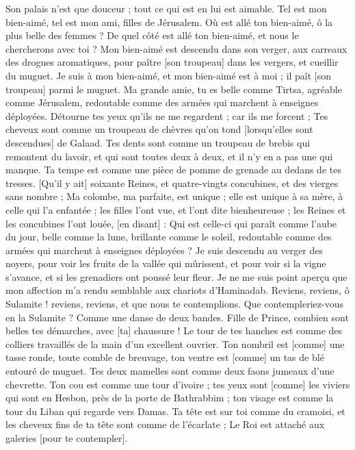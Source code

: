 \begin{multicols}{2}
Son palais n'est que douceur ; tout ce qui est en lui est aimable. Tel est mon bien-aimé, tel est mon ami, filles de Jérusalem.
\VerseOne{}Où est allé ton bien-aimé, ô la plus belle des femmes ? De quel côté est allé ton bien-aimé, et nous le chercherons avec toi ?
Mon bien-aimé est descendu dans son verger, aux carreaux des drogues aromatiques, pour paître [son troupeau] dans les vergers, et cueillir du muguet.
Je suis à mon bien-aimé, et mon bien-aimé est à moi ; il paît [son troupeau] parmi le muguet.
Ma grande amie, tu es belle comme Tirtsa, agréable comme Jérusalem, redoutable comme des armées qui marchent à enseignes déployées.
Détourne tes yeux qu'ils ne me regardent ; car ils me forcent ; Tes cheveux sont comme un troupeau de chèvres qu'on tond [lorsqu'elles sont descendues] de Galaad.
Tes dents sont comme un troupeau de brebis qui remontent du lavoir, et qui sont toutes deux à deux, et il n'y en a pas une qui manque.
Ta tempe est comme une pièce de pomme de grenade au dedans de tes tresses.
[Qu'il y ait] soixante Reines, et quatre-vingts concubines, et des vierges sans nombre ;
Ma colombe, ma parfaite, est unique ; elle est unique à sa mère, à celle qui l'a enfantée ; les filles l'ont vue, et l'ont dite bienheureuse ; les Reines et les concubines l'ont louée, [en disant] :
Qui est celle-ci qui paraît comme l'aube du jour, belle comme la lune, brillante comme le soleil, redoutable comme des armées qui marchent à enseignes déployées ?
Je suis descendu au verger des noyers, pour voir les fruits de la vallée qui mûrissent, et pour voir si la vigne s'avance, et si les grenadiers ont poussé leur fleur.
Je ne me suis point aperçu que mon affection m'a rendu semblable aux chariots d'Haminadab.
Reviens, reviens, ô Sulamite ! reviens, reviens, et que nous te contemplions. Que contempleriez-vous en la Sulamite ? Comme une danse de deux bandes.
\VerseOne{}Fille de Prince, combien sont belles tes démarches, avec [ta] chaussure ! Le tour de tes hanches est comme des colliers travaillés de la main d'un excellent ouvrier.
Ton nombril est [comme] une tasse ronde, toute comble de breuvage, ton ventre est [comme] un tas de blé entouré de muguet.
Tes deux mamelles sont comme deux faons jumeaux d'une chevrette.
Ton cou est comme une tour d'ivoire ; tes yeux sont [comme] les viviers qui sont en Hesbon, près de la porte de Bathrabbim ; ton visage est comme la tour du Liban qui regarde vers Damas.
Ta tête est sur toi comme du cramoisi, et les cheveux fins de ta tête sont comme de l'écarlate ; Le Roi est attaché aux galeries [pour te contempler].

\end{multicols}
